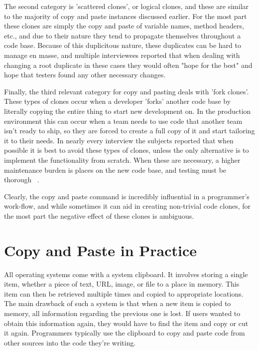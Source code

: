 \documentclass{acm_proc_article-sp}
\begin{document}
The second category is 'scattered clones', or logical clones, and these are similar to the majority of copy and paste instances discussed earlier. For the most part these clones are simply the copy and paste of variable names, method headers, etc., and due to their nature they tend to propagate themselves throughout a code base. Because of this duplicitous nature, these duplicates can be hard to manage en masse, and multiple interviewees reported that when dealing with changing a root duplicate in these cases they would often "hope for the best" and hope that testers found any other necessary changes.

Finally, the third relevant category for copy and pasting deals with 'fork clones'. These types of clones occur when a developer 'forks' another code base by literally copying the entire thing to start new development on. In the production environment this can occur when a team needs to use code that another team isn't ready to ship, so they are forced to create a full copy of it and start tailoring it to their needs. In nearly every interview the subjects reported that when possible it is best to avoid these types of clones, unless the only alternative is to implement the functionality from scratch. When these are necessary, a higher maintenance burden is places on the new code base, and testing must be thorough ~\cite{devWorkHabits}.

Clearly, the copy and paste command is incredibly influential in a programmer's work-flow, and while sometimes it can aid in creating non-trivial code clones, for the most part the negative effect of these clones is ambiguous. 

\section{Copy and Paste in Practice}\label{Copy}

All operating systems come with a system clipboard. It involves storing a single item, whether a piece of text, URL, image, or file to a place in memory. This item can then be retrieved multiple times and copied to appropriate locations. The main drawback of such a system is that when a new item is copied to memory, all information regarding the previous one is lost. If users wanted to obtain this information again, they would have to find the item and copy or cut it again. Programmers typically use the  clipboard to copy and paste code from other sources into the code they're writing.~\cite{codeReuse}
\end{document}
